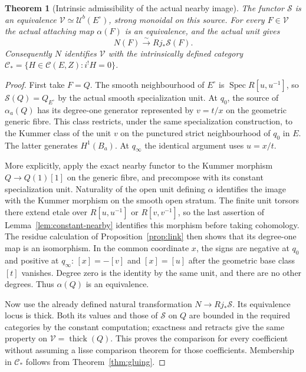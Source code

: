 \documentclass[11pt]{article}
\newtheorem{theorem}{Theorem}[section]
\theoremstyle{definition}
\theoremstyle{remark}
\newcommand{\Spec}{\operatorname{Spec}}
\newcommand{\thick}{\operatorname{thick}}
\begin{document}
\begin{theorem}[Intrinsic admissibility of the actual nearby image]
\label{thm:actual-nearby-image}
The functor $\mathcal S$ is an equivalence
$\mathcal V\simeq\mathcal U^b(E^\circ)$, strong monoidal on this
source.  For every $F\in\mathcal V$ the actual attaching map $\alpha(F)$
is an equivalence, and the actual unit gives
\[
 N(F)\xrightarrow{\sim}Rj_*\mathcal S(F).
\]
Consequently $N$ identifies $\mathcal V$ with the intrinsically defined
category $\mathcal C_*=\{H\in\mathcal C(E,Z):i^!H=0\}$.
\end{theorem}
\begin{proof}
First take $F=Q$.  The smooth neighbourhood of $E^\circ$ is
$\Spec R[u,u^{-1}]$, so $\mathcal S(Q)=Q_{E^\circ}$ by the actual
smooth specialization unit.  At $q_0$, the source of $\alpha_a(Q)$
has its degree-one generator represented by $v=t/x$ on the geometric
generic fibre.  This class restricts, under the same specialization
construction, to the Kummer class of the unit $v$ on the punctured
strict neighbourhood of $q_0$ in $E$.  The latter generates $H^1(B_a)$.
At $q_\infty$ the identical argument uses $u=x/t$.

More explicitly, apply the exact nearby functor to the Kummer morphism
$Q\to Q(1)[1]$ on the generic fibre, and precompose with its constant
specialization unit.  Naturality of the open unit defining $\alpha$
identifies the image with the Kummer morphism on the smooth open
stratum.  The finite unit torsors there extend etale over
$R[u,u^{-1}]$ or $R[v,v^{-1}]$, so the last assertion of
Lemma~\ref{lem:constant-nearby} identifies this morphism before taking
cohomology.  The residue calculation of Proposition~\ref{prop:link}
then shows that its degree-one map is an isomorphism.  In the common
coordinate $x$, the signs are negative at $q_0$ and positive at
$q_\infty$: $[x]=-[v]$ and $[x]=[u]$ after the geometric base class
$[t]$ vanishes.  Degree zero is the identity by the same unit, and
there are no other degrees.  Thus $\alpha(Q)$ is an equivalence.

Now use the already defined natural transformation $N\to Rj_*\mathcal S$.
Its equivalence locus is thick.  Both its values and those of
$\mathcal S$ on $Q$ are bounded in the required categories by the
constant computation; exactness and retracts give the same property
on $\mathcal V=\thick(Q)$.  This proves the comparison for every
coefficient without assuming a lisse comparison theorem for those
coefficients.  Membership in $\mathcal C_*$ follows from
Theorem~\ref{thm:gluing}.


\end{proof}
\end{document}
